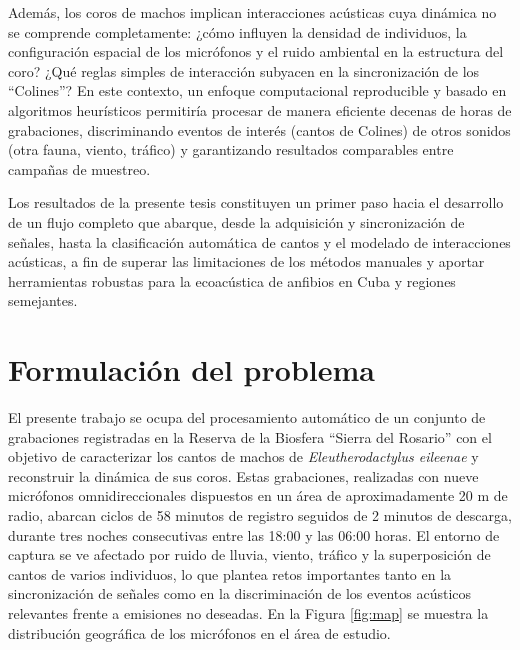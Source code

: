 Además, los coros de machos implican interacciones acústicas 
cuya dinámica no se comprende completamente: ¿cómo influyen la 
densidad de individuos, la configuración espacial de los 
micrófonos y el ruido ambiental en la estructura del coro? 
¿Qué reglas simples de interacción subyacen en la sincronización 
de los “Colines”? En este contexto, un enfoque computacional reproducible
y basado en algoritmos heurísticos permitiría procesar de 
manera eficiente decenas de horas de grabaciones, discriminando 
eventos de interés (cantos de Colines) de otros sonidos 
(otra fauna, viento, tráfico) y garantizando resultados 
comparables entre campañas de muestreo.

Los resultados de la presente tesis constituyen un primer paso hacia 
el desarrollo de un 
flujo completo que abarque, desde la adquisición y sincronización 
de señales, hasta la clasificación automática de cantos y el 
modelado de interacciones acústicas, a fin de superar las 
limitaciones de los métodos manuales y aportar herramientas 
robustas para la ecoacústica de anfibios en Cuba y regiones 
semejantes.

\section{Formulación del problema}
\label{sec:formulacion_problema}

El presente trabajo se ocupa del procesamiento automático de un 
conjunto de grabaciones registradas en la Reserva de 
la Biosfera “Sierra del Rosario” con el objetivo de 
caracterizar los cantos de machos de 
\emph{Eleutherodactylus eileenae} y reconstruir la dinámica de 
sus coros. Estas grabaciones, realizadas con nueve micrófonos 
omnidireccionales dispuestos en un área de aproximadamente 20 m 
de radio, abarcan ciclos de 58 minutos de registro seguidos de 
2 minutos de descarga, durante tres noches consecutivas entre 
las 18:00 y las 06:00 horas. El entorno de captura se ve 
afectado por ruido de lluvia, viento, tráfico y la superposición 
de cantos de varios individuos, lo que plantea retos importantes 
tanto en la sincronización de señales como en la discriminación 
de los eventos acústicos relevantes frente a emisiones no 
deseadas. En la Figura \ref{fig:map} se muestra la distribución geográfica de los micrófonos en el área de estudio.

